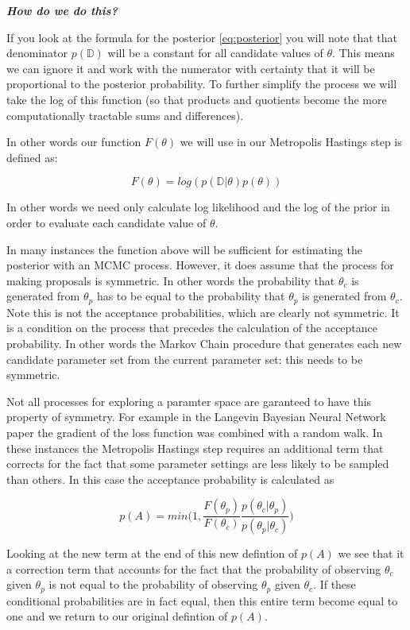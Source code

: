 \documentclass[12pt,a4paper]{article}
\numberwithin{equation}{section}
\begin{document}
\textbf{\textit{How do we do this?}}

If you look at the formula for the posterior \ref{eq:posterior} you will note that that denominator $p(\mathbb{D})$ will be a constant for all
candidate values of $\theta$. This means we can ignore it and work with the numerator with certainty that it will 
be proportional to the posterior probability. To further simplify the process we will take the log of this function 
(so that products and quotients become the more computationally tractable sums and differences). 

In other words our function $F(\theta)$ we will use in our Metropolis Hastings step is defined as:

\begin{equation}
F(\theta) = log(p(\mathbb{D} | \theta) p(\theta))
\end{equation} 

In other words we need only calculate log likelihood and the log of the prior in order to evaluate each candidate value of $\theta$. 
 
In many instances the function above will be sufficient for estimating the posterior with an MCMC process.
However, it does assume that the process for making proposals is symmetric. In other words the probability that
$\theta_c$ is generated from $\theta_p$ has to be equal to the probability that $\theta_p$ is generated from $\theta_c$.
Note this is not the acceptance probabilities, which are clearly not symmetric. It is a condition on the process that
precedes the calculation of the acceptance probability. In other words the Markov Chain procedure that generates each new
candidate parameter set from the current parameter set: this needs to be symmetric.

Not all processes for exploring a paramter space are garanteed to have this property of symmetry. 
For example in the Langevin Bayesian Neural Network paper the gradient of the loss function was combined with a random walk. 
In these instances the Metropolis Hastings step requires an additional term
that corrects for the fact that some parameter settings are less likely to be sampled than others. In this case the acceptance probability is
calculated as 

\begin{equation}
p(A) = min \Big( 1, \frac{ F(\theta_p) } {F(\theta_c) } \frac{p(\theta_c | \theta_p)}{p(\theta_p | \theta_c)}  \Big)
\end{equation}

Looking at the new term at the end of this new defintion of $p(A)$ we see that it a correction term that accounts for the fact
that the probability of observing $\theta_c$ given $\theta_p$ is not equal to the probability of observing $\theta_p$ given $\theta_c$.
If these conditional probabilities are in fact equal, then this entire term become equal to one and we return to our original defintion
of $p(A)$.
\end{document}
